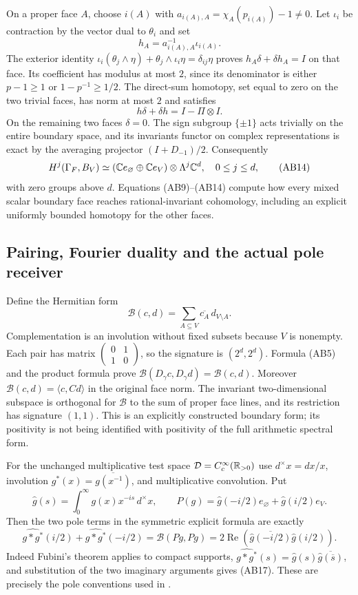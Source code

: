 On a proper face $A$, choose $i(A)$ with
$a_{i(A),A}=\chi_A(p_{i(A)})-1\ne0$. Let $\iota_i$ be contraction by
the vector dual to $\theta_i$ and set
\[
 h_A=a_{i(A),A}^{-1}\iota_{i(A)}.
 \tag{AB12}
\]
The exterior identity
$\iota_i(\theta_j\wedge\eta)+\theta_j\wedge\iota_i\eta
=\delta_{ij}\eta$ proves $h_A\delta+\delta h_A=I$ on that face.
Its coefficient has modulus at most $2$, since its denominator is either
$p-1\ge1$ or $1-p^{-1}\ge1/2$. The direct-sum homotopy, set equal to zero
on the two trivial faces, has norm at most $2$ and satisfies
\[
 h\delta+\delta h=I-\Pi\otimes I.
 \tag{AB13}
\]
On the remaining two faces $\delta=0$. The sign subgroup $\{\pm1\}$
acts trivially on the entire boundary space, and its invariants functor on
complex representations is exact by the averaging projector
$(I+D_{-1})/2$. Consequently
\[
 H^j(\Gamma_F,B_V)
 \simeq (\mathbb C e_\varnothing\oplus\mathbb C e_V)\otimes\Lambda^j\mathbb C^d,
 \quad 0\le j\le d,
 \tag{AB14}
\]
with zero groups above $d$. Equations (AB9)--(AB14) compute how every
mixed scalar boundary face reaches rational-invariant cohomology, including
an explicit uniformly bounded homotopy for the other faces.

\subsection{Pairing, Fourier duality and the actual pole receiver}
Define the Hermitian form
\[
 \mathscr B(c,d)=\sum_{A\subseteq V}\overline{c_A}\,d_{V\setminus A}.
 \tag{AB15}
\]
Complementation is an involution without fixed subsets because $V$ is
nonempty. Each pair has matrix $\left(\begin{smallmatrix}0&1\\1&0\end{smallmatrix}\right)$,
so the signature is $(2^d,2^d)$. Formula (AB5) and the product formula prove
$\mathscr B(D_\gamma c,D_\gamma d)=\mathscr B(c,d)$.
Moreover $\mathscr B(c,d)=\langle c,Cd\rangle$ in the original face norm.
The invariant two-dimensional subspace is orthogonal for $\mathscr B$ to
the sum of proper face lines, and its restriction has signature $(1,1)$.
This is an explicitly constructed boundary form; its positivity is not
being identified with positivity of the full arithmetic spectral form.

For the unchanged multiplicative test space $\mathcal D=C_c^\infty(\mathbb R_{>0})$
use $d^\times x=dx/x$, involution $g^*(x)=\overline{g(x^{-1})}$,
and multiplicative convolution. Put
\[
 \widehat g(s)=\int_0^\infty g(x)x^{-is}\,d^\times x,
 \qquad P(g)=\widehat g(-i/2)e_\varnothing+\widehat g(i/2)e_V.
 \tag{AB16}
\]
Then the two pole terms in the symmetric explicit formula are exactly
\[
 \widehat{g*g^*}(i/2)+\widehat{g*g^*}(-i/2)
 =\mathscr B(Pg,Pg)
 =2\operatorname{Re}\left(\overline{\widehat g(-i/2)}
                              \widehat g(i/2)\right).
 \tag{AB17}
\]
Indeed Fubini's theorem applies to compact supports,
$\widehat{g*g^*}(s)=\widehat g(s)\overline{\widehat g(\overline s)}$,
and substitution of the two imaginary arguments gives (AB17).
These are precisely the pole conventions used in
\cite[\texttt{sectweilpos}, \texttt{wp}]{Connes2026}.

